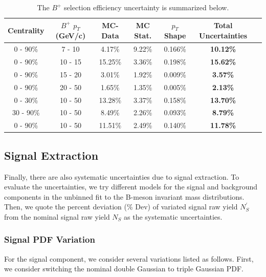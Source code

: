 \begin{table}[h]
\begin{center}
\caption{The $B^+$ selection efficiency uncertainty is summarized below.}
\vspace{1em}
\label{BPSelSum}
  \begin{tabular}{| c | c |c | c| c| c| c| }
    \hline
     Centrality & $B^+$ $p_T$ (GeV/c) & MC-Data  & MC Stat. & $p_T$ Shape & Total Uncertainties \\
    \hline
    \hline
0 - 90\% & 7 - 10 &   4.17\%  &  9.22\% & 0.166\% &  \textbf{10.12\%} \\ 
0 - 90\% & 10 - 15 & 15.25\%  & 3.36\%  & 0.198\% &   \textbf{15.62\%}  \\ 
0 - 90\% & 15 - 20 &  3.01\%   & 1.92\%   & 0.009\% &  \textbf{3.57\%} \\ 
0 - 90\% & 20 - 50 &  1.65\%   & 1.35\%  &  0.005\%  &   \textbf{2.13\%}\\ 
0 - 30\% & 10 - 50  & 13.28\%  & 3.37\%  &0.158\% &  \textbf{13.70\%} \\ 
30 - 90\% & 10 - 50 &  8.49\% &   2.26\%  & 0.093\% &  \textbf{8.79\%} \\ 
0 - 90\% & 10 - 50 & 11.51\%   & 2.49\%  & 0.140\% &   \textbf{11.78\%} \\ 
    \hline
    \hline
\end{tabular}
\end{center}
\end{table}



\subsection{Signal Extraction}

Finally, there are also systematic uncertainties due to signal extraction. To evaluate the uncertainties, we try different models for the signal and background components in the unbinned fit to the B-meson invariant mass distributions. Then, we quote the percent deviation (\% Dev) of variated signal raw yield $N_S^{'}$ from the nominal signal raw yield $N_S$ as the systematic uncertainties.  

\subsubsection{Signal PDF Variation}

For the signal component, we consider several variations listed as follows. First, we consider switching the nominal double Gaussian to triple Gaussian PDF.

